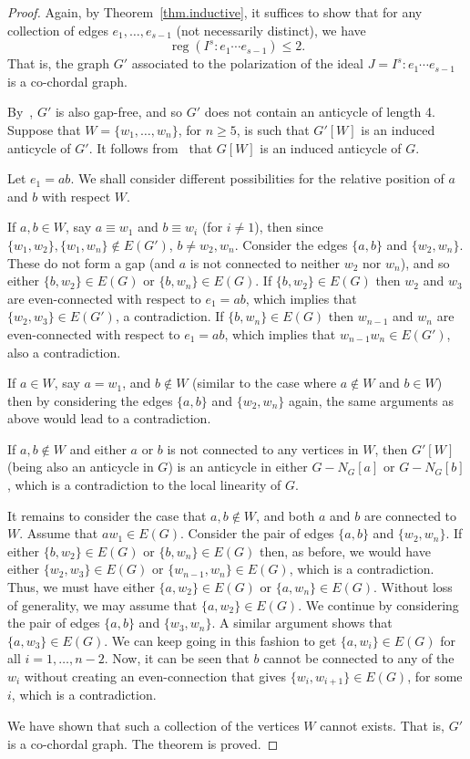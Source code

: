 \documentclass[ALCO,ThmDefs,Unicode,epreuves]{cedram}
\DeclareMathOperator{\reg}{reg}
\newcommand*{\reg}{\mathrm{reg}}
\begin{document}
\begin{proof} Again, by Theorem~\ref{thm.inductive}, it suffices to show that for any collection of edges $e_1, \dots, e_{s-1}$ (not necessarily distinct), we have
\[
\reg (I^s : e_1 \cdots e_{s-1}) \le 2.
\]
That is, the graph $G'$ associated to the polarization of the ideal $J = I^s : e_1 \cdots e_{s-1}$ is a co-chordal graph.

By~\cite[Lemma 6.14]{Ba}, $G'$ is also gap-free, and so $G'$ does not contain an anticycle of length 4. Suppose that $W = \{w_1, \ldots, w_n\}$, for $n \ge 5$, is such that $G'[W]$ is an induced anticycle of $G'$. It follows from~\cite[Lemma 6.15]{Ba} that $G[W]$ is an induced anticycle of $G$.

Let $e_1 = ab$. We shall consider different possibilities for the relative position of $a$ and $b$ with respect $W$.

If $a, b \in W$, say $a \equiv w_1$ and $b \equiv w_i$ (for $i \not= 1$), then since $\{w_1,w_2\}, \{w_1,w_n\} \not\in E(G')$, $b \not= w_2, w_n$. Consider the edges $\{a,b\}$ and $\{w_2,w_n\}$. These do not form a gap (and $a$ is not connected to neither $w_2$ nor $w_n$), and so either $\{b,w_2\} \in E(G)$ or $\{b,w_n\} \in E(G)$. If $\{b,w_2\} \in E(G)$ then $w_2$ and $w_3$ are even-connected with respect to $e_1 = ab$, which implies that $\{w_2,w_3\} \in E(G')$, a contradiction. If $\{b,w_n\} \in E(G)$ then $w_{n-1}$ and $w_n$ are even-connected with respect to $e_1 = ab$, which implies that $w_{n-1}w_n \in E(G')$, also a contradiction.

If $a \in W$, say $a = w_1$, and $b \not\in W$ (similar to the case where $a \not\in W$ and $b \in W$) then by considering the edges $\{a,b\}$ and $\{w_2,w_n\}$ again, the same arguments as above would lead to a contradiction.

If $a,b \not\in W$ and either $a$ or $b$ is not connected to any vertices in $W$, then $G'[W]$ (being also an anticycle in $G$) is an anticycle in either $G-N_{G}[a]$ or $G-N_{G}[b]$, which is a contradiction to the local linearity of $G$.

It remains to consider the case that $a,b \not\in W$, and both $a$ and $b$ are connected to $W$. Assume that $aw_1 \in E(G)$. Consider the pair of edges $\{a,b\}$ and $\{w_2,w_n\}$. If either $\{b,w_2\} \in E(G)$ or $\{b,w_n\} \in E(G)$ then, as before, we would have either $\{w_2,w_3\} \in E(G)$ or $\{w_{n-1},w_n\} \in E(G)$, which is a contradiction. Thus, we must have either $\{a,w_2\} \in E(G)$ or $\{a,w_n\} \in E(G)$. Without loss of generality, we may assume that $\{a,w_2\} \in E(G)$. We continue by considering the pair of edges $\{a,b\}$ and $\{w_3, w_n\}$. A similar argument shows that $\{a,w_3\} \in E(G)$. We can keep going in this fashion to get $\{a,w_i\} \in E(G)$ for all $i = 1, \dots, n-2$. Now, it can be seen that $b$ cannot be connected to any of the $w_i$ without creating an even-connection that gives $\{w_i,w_{i+1}\} \in E(G)$, for some $i$, which is a contradiction.

We have shown that such a collection of the vertices $W$ cannot exists. That is, $G'$ is a co-chordal graph. The theorem is proved.
\end{proof}
\end{document}
